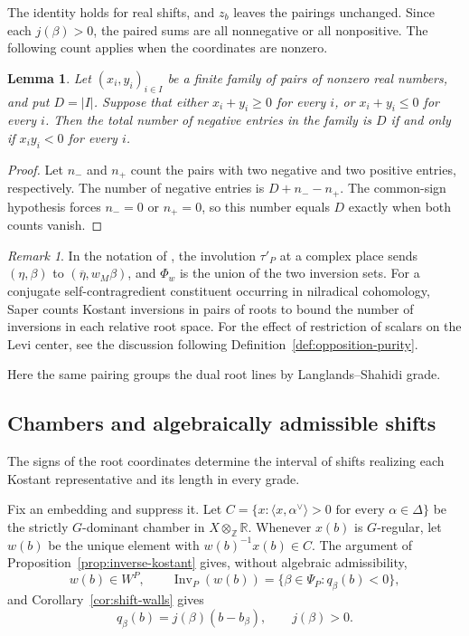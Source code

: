 \documentclass[12pt]{amsart}
\numberwithin{equation}{section}
\theoremstyle{plain}
\newtheorem{lemma}[theorem]{Lemma}
\theoremstyle{definition}
\theoremstyle{remark}
\newtheorem{remark}[theorem]{Remark}
\renewcommand{\bar}{\overline}
\DeclareMathOperator{\Inv}{Inv}
\begin{document}
The identity holds for real shifts, and $z_b$ leaves the pairings unchanged. Since each $j(\beta)>0$, the paired sums are all nonnegative or all nonpositive. The following count applies when the coordinates are nonzero. 

\begin{lemma}\label{lem:common-sign}
Let $(x_i,y_i)_{i\in I}$ be a finite family of pairs of nonzero real numbers, and put $D=|I|$. Suppose that either $x_i+y_i\geq0$ for every $i$, or $x_i+y_i\leq0$ for every $i$. Then the total number of negative entries in the family is $D$ if and only if $x_iy_i<0$ for every $i$.
\end{lemma}
\begin{proof}
Let $n_-$ and $n_+$ count the pairs with two negative and two positive entries, respectively. The number of negative entries is $D+n_--n_+$. The common-sign hypothesis forces $n_-=0$ or $n_+=0$, so this number equals $D$ exactly when both counts vanish.
\end{proof}

\begin{remark} \label{rem:saper-dictionary}
In the notation of \cite[Prop.~8.4, Lemma~17.6 and Basic Lemma~24.2]{SaperMicro}, the involution $\tau'_P$ at a complex place sends $(\eta,\beta)$ to $(\bar\eta,w_M\beta)$, and $\Phi_w$ is the union of the two inversion sets. For a conjugate self-contragredient constituent occurring in nilradical cohomology, Saper counts Kostant inversions in pairs of roots to bound the number of inversions in each relative root space. For the effect of restriction of scalars on the Levi center, see the discussion following Definition~\ref{def:opposition-purity}.

Here the same pairing groups the dual root lines by Langlands--Shahidi grade.
\end{remark}

\subsection{Chambers and algebraically admissible shifts} \label{sec:chamber-intervals}
The signs of the root coordinates determine the interval of shifts realizing each Kostant representative and its length in every grade.

Fix an embedding and suppress it. Let $C=\{x:\langle x,\alpha^\vee\rangle>0 \text{ for every }\alpha\in\Delta\}$ be the strictly $G$-dominant chamber in $X\otimes_{\mathbb Z}\mathbb R$. Whenever $x(b)$ is $G$-regular, let $w(b)$ be the unique element with $w(b)^{-1}x(b)\in C$. The argument of Proposition~\ref{prop:inverse-kostant} gives, without algebraic admissibility,
\[
 w(b)\in W^P,\qquad
 \Inv_P(w(b))=\{\beta\in\Psi_P:q_\beta(b)<0\},
\]
and Corollary~\ref{cor:shift-walls} gives
\begin{equation}\label{eq:root-line}
 q_\beta(b)=j(\beta)(b-b_\beta),\qquad j(\beta)>0.
\end{equation}
\end{document}
